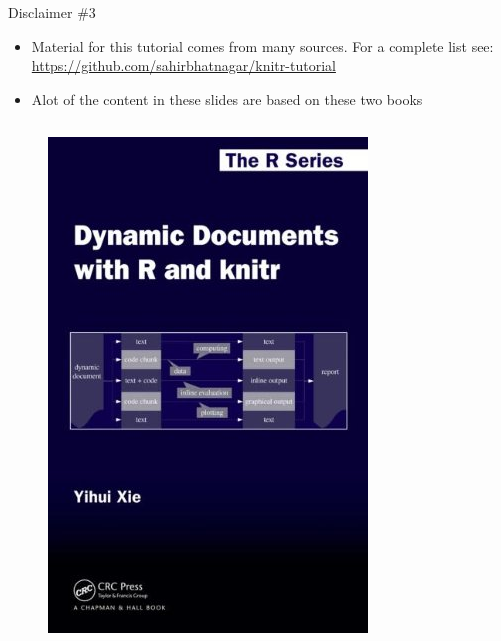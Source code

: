 \documentclass[10pt]{beamer}\usepackage[]{graphicx}\usepackage[]{color}
\begin{document}
\begin{frame}{Disclaimer \#3}

\begin{itemize}
\item Material for this tutorial comes from many sources. For a complete list see:  \href{https://github.com/sahirbhatnagar/knitr-tutorial}{https://github.com/sahirbhatnagar/knitr-tutorial}
\item Alot of the content in these slides are based on these two books
\end{itemize}

\begin{columns}[c] %
\begin{figure}
\includegraphics[width=0.6\columnwidth]{yihui.png}
\end{figure}


\end{columns}
\end{frame}
\end{document}
